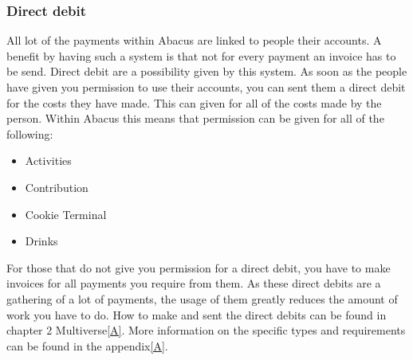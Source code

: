 \documentclass{report}
\begin{document}
\subsubsection{Direct debit}
All lot of the payments within Abacus are linked to people their accounts. A benefit by having such a system is that not for every payment an invoice has to be send. Direct debit are a possibility given by this system. As soon as the people have given you permission to use their accounts, you can sent them a direct debit for the costs they have made. This can given for all of the costs made by the person. Within Abacus this means that permission can be given for all of the following: 
\begin{itemize} 
	\vspace{-1mm}
	\itemsep-1mm 
	\item Activities
	\item Contribution
	\item Cookie Terminal
	\item Drinks
\end{itemize}
For those that do not give you permission for a direct debit, you have to make invoices for all payments you require from them. As these direct debits are a gathering of a lot of payments, the usage of them greatly reduces the amount of work you have to do. How to make and sent the direct debits can be found in chapter 2 Multiverse\ref{A}. More information on the specific types and requirements can be found in the appendix\ref{A}.  
\end{document}
